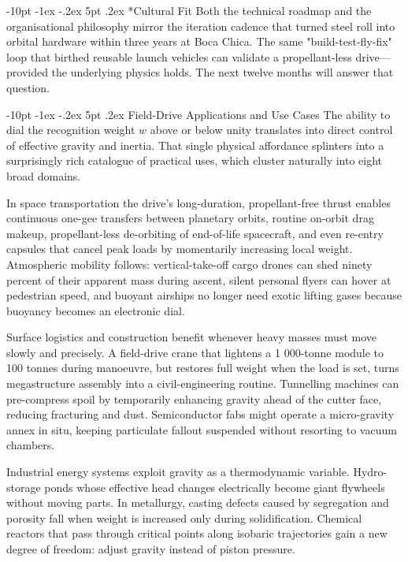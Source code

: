 \documentclass[12pt,letterpaper]{book}
\makeatletter
\renewcommand\section{\@startsection {section}{1}{\z@}%
                {-10pt \@plus -1ex \@minus -.2ex}%
                {5pt \@plus.2ex}%
                {\normalfont\large\bfseries}}
\makeatother
\begin{document}
\section*{Cultural Fit}
Both the technical roadmap and the organisational philosophy mirror the iteration cadence that turned steel roll into orbital hardware within three years at Boca Chica.  The same "build-test-fly-fix" loop that birthed reusable launch vehicles can validate a propellant-less drive—provided the underlying physics holds.  The next twelve months will answer that question.

\section{Field-Drive Applications and Use Cases}
The ability to dial the recognition weight $w$ above or below unity translates into direct control of effective gravity and inertia.  That single physical affordance splinters into a surprisingly rich catalogue of practical uses, which cluster naturally into eight broad domains.

In space transportation the drive's long-duration, propellant-free thrust enables continuous one-gee transfers between planetary orbits, routine on-orbit drag makeup, propellant-less de-orbiting of end-of-life spacecraft, and even re-entry capsules that cancel peak loads by momentarily increasing local weight.  Atmospheric mobility follows: vertical-take-off cargo drones can shed ninety percent of their apparent mass during ascent, silent personal flyers can hover at pedestrian speed, and buoyant airships no longer need exotic lifting gases because buoyancy becomes an electronic dial.

Surface logistics and construction benefit whenever heavy masses must move slowly and precisely.  A field-drive crane that lightens a 1 000-tonne module to 100 tonnes during manoeuvre, but restores full weight when the load is set, turns megastructure assembly into a civil-engineering routine.  Tunnelling machines can pre-compress spoil by temporarily enhancing gravity ahead of the cutter face, reducing fracturing and dust.  Semiconductor fabs might operate a micro-gravity annex in situ, keeping particulate fallout suspended without resorting to vacuum chambers.

Industrial energy systems exploit gravity as a thermodynamic variable.  Hydro-storage ponds whose effective head changes electrically become giant flywheels without moving parts.  In metallurgy, casting defects caused by segregation and porosity fall when weight is increased only during solidification.  Chemical reactors that pass through critical points along isobaric trajectories gain a new degree of freedom: adjust gravity instead of piston pressure.
\end{document}
